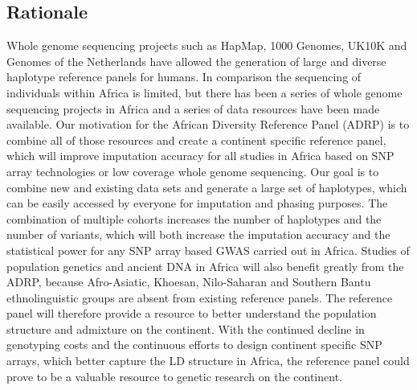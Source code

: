 \subsection{Rationale}

Whole genome sequencing projects such as HapMap\cite{HapMap2010}, 1000 Genomes\cite{1000G2012}, UK10K\cite{UK10K} and Genomes of the Netherlands\cite{GoNL} have allowed the generation of large and diverse haplotype reference panels for humans. In comparison the sequencing of individuals within Africa is limited, but there has been a series of whole genome sequencing projects in Africa and a series of data resources have been made available. Our motivation for the African Diversity Reference Panel (ADRP) is to combine all of those resources and create a continent specific reference panel, which will improve imputation accuracy for all studies in Africa based on SNP array technologies or low coverage whole genome sequencing. Our goal is to combine new and existing data sets and generate a large set of haplotypes, which can be easily accessed by everyone for imputation and phasing purposes. The combination of multiple cohorts increases the number of haplotypes and the number of variants, which will both increase the imputation accuracy and the statistical power for any SNP array based GWAS carried out in Africa.
Studies of population genetics and ancient DNA in Africa will also benefit greatly from the ADRP, because Afro-Asiatic, Khoesan, Nilo-Saharan and Southern Bantu ethnolinguistic groups are absent from existing reference panels. The reference panel will therefore provide a resource to better understand the population structure and admixture on the continent.
With the continued decline in genotyping costs and the continuous efforts to design continent specific SNP arrays, which better capture the LD structure in Africa, the reference panel could prove to be a valuable resource to genetic research on the continent.


